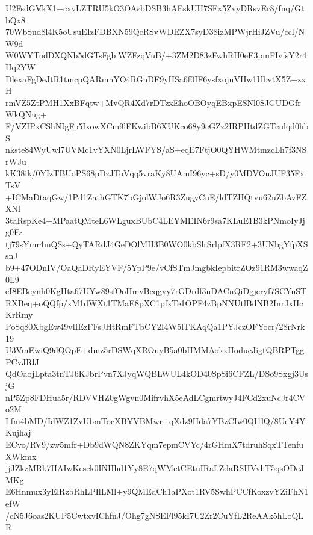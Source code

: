 U2FsdGVkX1+cxvLZTRU5kO3OAvbDSB3hAEskUH7SFx5ZvyDRsvEr8/fnq/GtbQx8
70WbSud8l4K5oUsuEIzFDBXN59QcRSvWDEZX7syD38izMPWjrHiJZVu/ccl/NW9d
W0WYTndDXQNb5dGTsFgbiWZFzqVuB/+3ZM2D83zFwhRH0eE3pmFIvfsY2r4Hq2YW
DlexaFgDeJtR1tmcpQARmnYO4RGnDF9yIISa6f0IF6ysfxojuVHw1UbvtX5Z+zxH
rmVZ5ZtPMH1XxBFqtw+MvQR4Xd7rDTzxEhoOBOyqEBxpESNl0SJGUDGfrWkQNug+
F/VZIPxCShNIgFp5IxowXCm9lFKwibB6XUKco68y9cGZz2IRPHtdZGTculqd0hbS
nkste84WyUwl7UVMc1vYXN0LjrLWFYS/aS+eqE7FtjO0QYHWMtmzcLh7f3NSrWJu
kK38ik/0YIzTBUoPS68pDzJToVqq5vraKy8UAmI96yc+sD/y0MDVOnJUF35FxTsV
+ICMaDtaqGw/1Pd1ZathGTK7bGjolWJo6R3ZugyCuE/ldTZHQtvu62uZbAvFZXNl
3taRspKe4+MPaatQMteL6WLguxBUbC4LEYMEIN6r9sa7KLuE1B3kPNmoIyJjg0Fz
tj79sYmr4mQSs+QyTARdJ4GeDOlMH3B0WO0kbSlrSrlpfX3RF2+3UNbgYfpXSsnJ
b9+47ODnIV/OaQaDRyEYVF/5YpP9e/vCfSTmJmgbkIepbitrZOz91RM3wwaqZ0L9
eI8EBcynh0KgHta67UYw89sfOoHmvBcqgvy7rGDrdf3uDACnQiDgjcryf7SCYuST
RXBeq+oQQfp/xM1dWXt1TMaE8pXC1pfxTe1OPF4zBpNNUtlBdNB2InrJxHcKrRmy
PoSq80XbgEw49vlIEzFFsJHtRmFTbCY2I4W5lTKAqQa1PYJczOFYocr/28rNrk19
U3VmEwiQ9dQOpE+dmz5rDSWqXROuyB5a0bHMMAokxHoducJigtQBRPTggPCvJRlJ
QdOaojLpta3tnTJ6KJbrPvn7XJyqWQBLWUL4kOD40SpSi6CFZL/DSo9Sxgj3UsjG
nP5Zp8FDHua5r/RDVVHZ0gWgvn0MifrvhX5eAdLCgmrtwyJ4FCd2xuNcJr4CVo2M
Lfm4bMD/IdWZ1ZvUbmTocXBYVBMwr+qXdz9Hda7YBzCIw0QI1lQ/8UeY4YKujhaj
ECvo/RV9/zw5mfr+Db9dWQN8ZKYqm7epmCVYc/4rGHmX7tdruhSqxTTenfuXWkmx
jjJZkzMRk7HAIwKcsck0INHhd1Yy8E7qWMetCEtuIRaLZdaRSHVvhT5qsODcJMKg
E6Hnmux3yElRzbRhLPIlLMl+y9QMEdCh1aPXot1RV5SwhPCCfKoxzvYZiFhN1efW
/cN5J6oas2KUP5CwtxvIChfnJ/Ohg7gNSEFl95kI7U2Zr2CuYfL2ReAAk5hLoQLR
